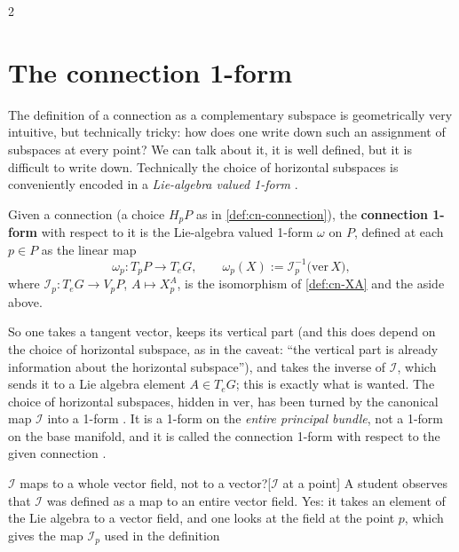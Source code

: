 \begin{paracol}{2}
\section{The connection 1-form}\label{sec:cn-form}

The definition of a connection as a complementary subspace is geometrically very intuitive, but technically tricky: how does one write down such an assignment of subspaces at every point? We can talk about it, it is well defined, but it is difficult to write down. Technically the choice of horizontal subspaces is conveniently encoded in a \emph{Lie-algebra valued 1-form}     .
\begin{definition}\label{def:cn-omega}
Given a connection (a choice $H_pP$ as in \cref{def:cn-connection}), the \textbf{connection 1-form} with respect to it is the Lie-algebra valued 1-form $\omega$ on $P$, defined at each $p\in P$ as the linear map
\[
  \omega_p\colon T_pP\to T_eG,\qquad\omega_p(X):=\mathcal I_p^{-1}\bigl(\mathrm{ver}\,X\bigr),
\]
where $\mathcal I_p\colon T_eG\to V_pP$, $A\mapsto X^A_p$, is the isomorphism of \cref{def:cn-XA} and the aside above.       
\end{definition}
So one takes a tangent vector, keeps its vertical part (and this does depend on the choice of horizontal subspace, as in the caveat: ``the vertical part is already information about the horizontal subspace''), and takes the inverse of $\mathcal I$, which sends it to a Lie algebra element $A\in T_eG$; this is exactly what is wanted. The choice of horizontal subspaces, hidden in $\mathrm{ver}$, has been turned by the canonical map $\mathcal I$ into a 1-form    . It is a 1-form on the \emph{entire principal bundle}, not a 1-form on the base manifold, and it is called the connection 1-form with respect to the given connection   .
\begin{answer}{$\mathcal I$ maps to a whole vector field, not to a vector?}[$\mathcal I$ at a point]
A student observes that $\mathcal I$ was defined as a map to an entire vector field. Yes: it takes an element of the Lie algebra to a vector field, and one looks at the field at the point $p$, which gives the map $\mathcal I_p$ used in the definition 

\end{answer}
\end{paracol}
